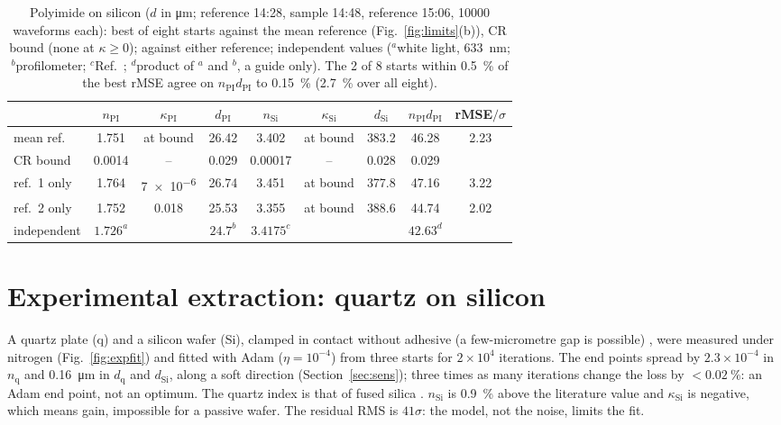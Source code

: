 \documentclass{optica-article}
\newcommand{\kap}{\kappa}
\newcommand{\nq}{n_{\mathrm q}}\newcommand{\kq}{\kap_{\mathrm q}}\newcommand{\dq}{d_{\mathrm q}}
\newcommand{\nS}{n_{\mathrm{Si}}}\newcommand{\kS}{\kap_{\mathrm{Si}}}\newcommand{\dS}{d_{\mathrm{Si}}}
\begin{document}
\begin{table}[!htb]\centering\scriptsize\setlength{\tabcolsep}{3.2pt}
  \caption{Polyimide on silicon ($d$ in \si{\micro\metre}; reference 14:28, sample 14:48, reference 15:06, \num{10000} waveforms each): best of eight starts against the mean reference (Fig.~\ref{fig:limits}(b)), CR bound (none at $\kap\ge0$); against either reference; independent values ($^a$white light, \SI{633}{\nano\metre}; $^b$profilometer; $^c$Ref.~\cite{Dai2004}; $^d$product of $^a$ and $^b$, a guide only). The 2 of 8 starts within \SI{0.5}{\percent} of the best rMSE agree on $n_{\mathrm{PI}}d_{\mathrm{PI}}$ to \SI{0.15}{\percent} (\SI{2.7}{\percent} over all eight).}
  \label{tab:pi}
  \begin{tabular}{l cccccc c c}\toprule
    & $n_{\mathrm{PI}}$ & $\kap_{\mathrm{PI}}$ & $d_{\mathrm{PI}}$ & $\nS$ & $\kS$ & $\dS$ & $n_{\mathrm{PI}}d_{\mathrm{PI}}$ & rMSE$/\sigma$\\\midrule
    mean ref. & 1.751 & at bound & 26.42 & 3.402 & at bound & 383.2 & 46.28 & 2.23\\
    CR bound & 0.0014 & -- & 0.029 & 0.00017 & -- & 0.028 & 0.029 & \\
    ref.\ 1 only & 1.764 & \num{7e-6} & 26.74 & 3.451 & at bound & 377.8 & 47.16 & 3.22\\
    ref.\ 2 only & 1.752 & 0.018 & 25.53 & 3.355 & at bound & 388.6 & 44.74 & 2.02\\\midrule
    independent & $1.726^a$ & & $24.7^b$ & $3.4175^c$ & & & $42.63^d$ & \\
    \bottomrule
  \end{tabular}
\end{table}

\section{Experimental extraction: quartz on silicon}\label{sec:exp}
A quartz plate (q) and a silicon wafer (Si), clamped in contact without adhesive (a few-micrometre gap is possible) , were measured under nitrogen (Fig.~\ref{fig:expfit}) and fitted with Adam ($\eta=10^{-4}$) from three starts for $2\times10^4$ iterations. The end points spread by $2.3\times10^{-4}$ in $\nq$ and \SI{0.16}{\micro\metre} in $\dq$ and $\dS$, along a soft direction (Section~\ref{sec:sens}); three times as many iterations change the loss by $<\SI{0.02}{\percent}$: an Adam end point, not an optimum. The quartz index is that of fused silica \cite{Grischkowsky1990,Naftaly2007} . $\nS$ is \SI{0.9}{\percent} above the literature value \cite{Dai2004} and $\kS$ is negative, which means gain, impossible for a passive wafer. The residual RMS is $41\sigma$: the model, not the noise, limits the fit.
\end{document}

